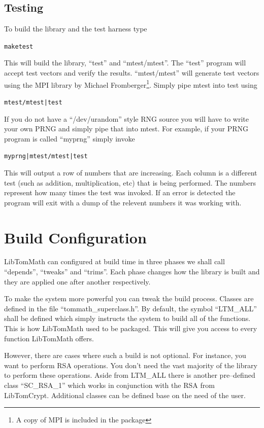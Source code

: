 \documentclass[synpaper]{book}
\begin{document}
\subsection{Testing}
To build the library and the test harness type

\begin{alltt}
make test
\end{alltt}

This will build the library, ``test'' and ``mtest/mtest''.  The ``test'' program will accept test vectors and verify the
results.  ``mtest/mtest'' will generate test vectors using the MPI library by Michael Fromberger\footnote{A copy of MPI
is included in the package}.  Simply pipe mtest into test using

\begin{alltt}
mtest/mtest | test
\end{alltt}

If you do not have a ``/dev/urandom'' style RNG source you will have to write your own PRNG and simply pipe that into 
mtest.  For example, if your PRNG program is called ``myprng'' simply invoke

\begin{alltt}
myprng | mtest/mtest | test
\end{alltt}

This will output a row of numbers that are increasing.  Each column is a different test (such as addition, multiplication, etc)
that is being performed.  The numbers represent how many times the test was invoked.  If an error is detected the program
will exit with a dump of the relevent numbers it was working with.

\section{Build Configuration}
LibTomMath can configured at build time in three phases we shall call ``depends'', ``tweaks'' and ``trims''.  
Each phase changes how the library is built and they are applied one after another respectively.  

To make the system more powerful you can tweak the build process.  Classes are defined in the file
``tommath\_superclass.h''.  By default, the symbol ``LTM\_ALL'' shall be defined which simply 
instructs the system to build all of the functions.  This is how LibTomMath used to be packaged.  This will give you 
access to every function LibTomMath offers.

However, there are cases where such a build is not optional.  For instance, you want to perform RSA operations.  You 
don't need the vast majority of the library to perform these operations.  Aside from LTM\_ALL there is 
another pre--defined class ``SC\_RSA\_1'' which works in conjunction with the RSA from LibTomCrypt.  Additional 
classes can be defined base on the need of the user.
\end{document}
